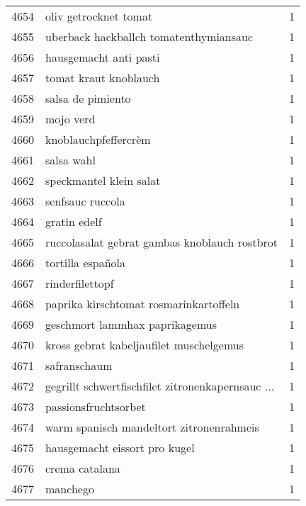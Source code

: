 \begin{tabular}{llr}
4654 &                              oliv getrocknet tomat &      1 \\
4655 &             uberback hackballch tomatenthymiansauc &      1 \\
4656 &                             hausgemacht anti pasti &      1 \\
4657 &                              tomat kraut knoblauch &      1 \\
4658 &                                  salsa de pimiento &      1 \\
4659 &                                          mojo verd &      1 \\
4660 &                               knoblauchpfeffercrèm &      1 \\
4661 &                                         salsa wahl &      1 \\
4662 &                            speckmantel klein salat &      1 \\
4663 &                                   senfsauc ruccola &      1 \\
4664 &                                       gratin edelf &      1 \\
4665 &      ruccolasalat gebrat gambas knoblauch rostbrot &      1 \\
4666 &                                  tortilla española &      1 \\
4667 &                                    rinderfilettopf &      1 \\
4668 &             paprika kirschtomat rosmarinkartoffeln &      1 \\
4669 &                     geschmort lammhax paprikagemus &      1 \\
4670 &            kross gebrat kabeljaufilet muschelgemus &      1 \\
4671 &                                       safranschaum &      1 \\
4672 &  gegrillt schwertfischfilet zitronenkapernsauc ... &      1 \\
4673 &                               passionsfruchtsorbet &      1 \\
4674 &           warm spanisch mandeltort zitronenrahmeis &      1 \\
4675 &                      hausgemacht eissort pro kugel &      1 \\
4676 &                                     crema catalana &      1 \\
4677 &                                           manchego &      1 \\

\end{tabular}
